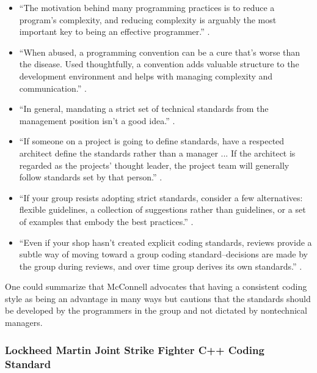 \begin{itemize}
{}\item ``The motivation behind many programming practices is to reduce a
program's complexity, and reducing complexity is arguably the most important
key to being an effective programmer.''  {}\cite[Chapter
34]{CodeComplete2nd04}.

{}\item ``When abused, a programming convention can be a cure that's worse
than the disease.  Used thoughtfully, a convention adds valuable structure to
the development environment and helps with managing complexity and
communication.''  {}\cite[Chapter 34]{CodeComplete2nd04}.

{}\item ``In general, mandating a strict set of technical standards from the
management position isn't a good idea.''  {}\cite[Section
28.1]{CodeComplete2nd04}.

{}\item ``If someone on a project is going to define standards, have a
respected architect define the standards rather than a manager ... If the
architect is regarded as the projects' thought leader, the project team will
generally follow standards set by that person.''  {}\cite[Section
28.1]{CodeComplete2nd04}.

{}\item ``If your group resists adopting strict standards, consider a few
alternatives: flexible guidelines, a collection of suggestions rather than
guidelines, or a set of examples that embody the best practices.''
{}\cite[Section 28.1]{CodeComplete2nd04}.

{}\item ``Even if your shop hasn't created explicit coding standards, reviews
provide a subtle way of moving toward a group coding standard--decisions are
made by the group during reviews, and over time group derives its own
standards.''  {}\cite[Section 28.1]{CodeComplete2nd04}.

\end{itemize}

One could summarize that McConnell advocates that having a consistent coding
style as being an advantage in many ways but cautions that the standards
should be developed by the programmers in the group and not dictated by
nontechnical managers.


%
\subsubsection{Lockheed Martin Joint Strike Fighter C++ Coding Standard}
%


